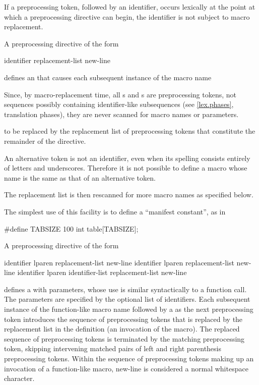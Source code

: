 \pnum
If a
\tcode{\#}
preprocessing token,
followed by an identifier,
occurs lexically
at the point at which a preprocessing directive can begin,
the identifier is not subject to macro replacement.

\pnum
A preprocessing directive of the form
\begin{ncsimplebnf}
 identifier replacement-list new-line
%
\end{ncsimplebnf}
defines an
 that
causes each subsequent instance of the macro name
\begin{footnote}
Since, by macro-replacement time,
all s and s are preprocessing tokens,
not sequences possibly containing identifier-like subsequences
(see \ref{lex.phases}, translation phases),
they are never scanned for macro names or parameters.
\end{footnote}
to be replaced by the replacement list of preprocessing tokens
that constitute the remainder of the directive.
\begin{footnote}
An alternative token is not an identifier,
even when its spelling consists entirely of letters and underscores.
Therefore it is not possible to define a macro
whose name is the same as that of an alternative token.
\end{footnote}
The replacement list is then rescanned for more macro names as
specified below.

\pnum
\begin{example}
The simplest use of this facility is to define a ``manifest constant'',
as in
\begin{codeblock}
#define TABSIZE 100
int table[TABSIZE];
\end{codeblock}
\end{example}

\pnum
A preprocessing directive of the form
\begin{ncsimplebnf}
 identifier lparen  \terminal{)} replacement-list new-line\br
{} identifier lparen  \terminal{)} replacement-list new-line\br
{} identifier lparen identifier-list  \terminal{)} replacement-list new-line
\end{ncsimplebnf}
defines a 
with parameters, whose use is
similar syntactically to a function call.
The parameters
%
are specified by the optional list of identifiers.
Each subsequent instance of the function-like macro name followed by a
\tcode{(}
as the next preprocessing token
introduces the sequence of preprocessing tokens that is replaced
by the replacement list in the definition
(an invocation of the macro).
%
The replaced sequence of preprocessing tokens is terminated by the matching
\tcode{)}
preprocessing token, skipping intervening matched pairs of left and
right parenthesis preprocessing tokens.
Within the sequence of preprocessing tokens making up an invocation
of a function-like macro,
new-line is considered a normal whitespace character.

